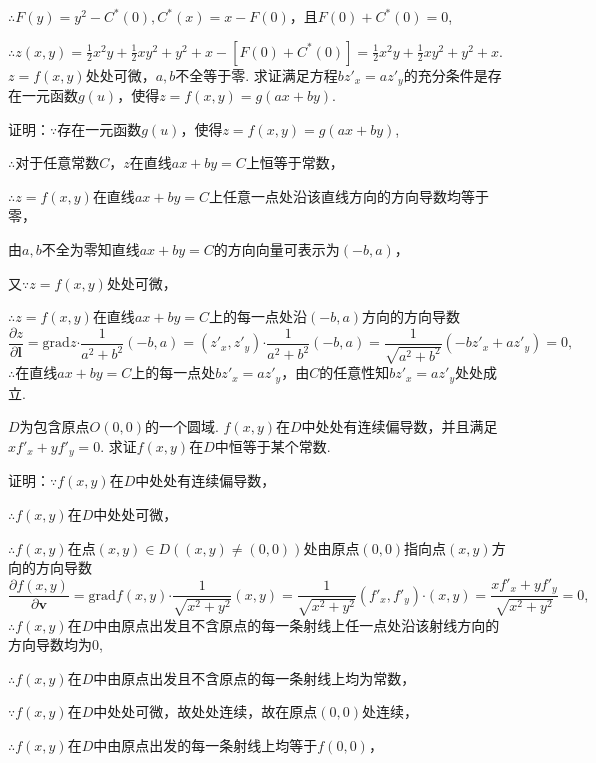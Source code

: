 \documentclass[12pt,UTF8]{ctexart}
\begin{document}
\begin{enumerate}
$\therefore F(y)=y^2-C^*(0),C^*(x)=x-F(0)$，且$F(0)+C^*(0)=0$,

$\therefore z(x,y)=\frac12x^2y+\frac12xy^2+y^2+x-[F(0)+C^*(0)]=\frac12x^2y+\frac12xy^2+y^2+x$.
$z=f(x,y)$处处可微，$a,b$不全等于零. 求证满足方程$bz'_x=az'_y$的充分条件是存在一元函数$g(u)$，使得$z=f(x,y)=g(ax+by)$.

证明：$\because$存在一元函数$g(u)$，使得$z=f(x,y)=g(ax+by)$,

$\therefore$对于任意常数$C$，$z$在直线$ax+by=C$上恒等于常数，

$\therefore z=f(x,y)$在直线$ax+by=C$上任意一点处沿该直线方向的方向导数均等于零，

由$a,b$不全为零知直线$ax+by=C$的方向向量可表示为$(-b,a)$，

又$\because z=f(x,y)$处处可微，

$\therefore z=f(x,y)$在直线$ax+by=C$上的每一点处沿$(-b,a)$方向的方向导数
\[\frac{\partial z}{\partial\bm l}=\mathrm{grad}z\bm\cdot\frac1{a^2+b^2}(-b,a)=(z'_x,z'_y)\bm\cdot\frac1{a^2+b^2}(-b,a)=\frac1{\sqrt{a^2+b^2}}(-bz'_x+az'_y)=0,\]
$\therefore$在直线$ax+by=C$上的每一点处$bz'_x=az'_y$，由$C$的任意性知$bz'_x=az'_y$处处成立.

$D$为包含原点$O(0,0)$的一个圆域. $f(x,y)$在$D$中处处有连续偏导数，并且满足$xf'_x+yf'_y=0$. 求证$f(x,y)$在$D$中恒等于某个常数.

证明：$\because f(x,y)$在$D$中处处有连续偏导数，

$\therefore f(x,y)$在$D$中处处可微，

$\therefore f(x,y)$在点$(x,y)\in D((x,y)\neq(0,0))$处由原点$(0,0)$指向点$(x,y)$方向的方向导数
\[\frac{\partial f(x,y)}{\partial\bm v}=\mathrm{grad}f(x,y)\bm\cdot\frac1{\sqrt{x^2+y^2}}(x,y)=\frac1{\sqrt{x^2+y^2}}(f'_x,f'_y)\bm\cdot(x,y)=\frac{xf'_x+yf'_y}{\sqrt{x^2+y^2}}=0,\]
$\therefore f(x,y)$在$D$中由原点出发且不含原点的每一条射线上任一点处沿该射线方向的方向导数均为$0$,

$\therefore f(x,y)$在$D$中由原点出发且不含原点的每一条射线上均为常数，

$\because f(x,y)$在$D$中处处可微，故处处连续，故在原点$(0,0)$处连续，

$\therefore f(x,y)$在$D$中由原点出发的每一条射线上均等于$f(0,0)$，


\end{enumerate}
\end{document}
